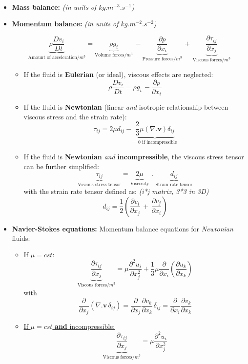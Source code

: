 \documentclass[a4paper,11pt]{article}
\begin{document}
\begin{itemize}
	\item \textbf{Mass balance:} \textit{(in units of $kg.m^{-3}.s^{-1}$)}
	\begin{center}
	\end{center}
	\item \textbf{Momentum balance:} \textit{(in units of $kg.m^{-2}.s^{-2}$)}
	\begin{center}
	\end{center}
	
	\[\underbrace{\rho \frac{Dv_i}{Dt}}_\textrm{Amount of acceleration/${m^3}$} = \underbrace{\rho g_i}_\textrm{Volume forces/${m^3}$}\, - \underbrace{\frac{\partial p}{\partial x_i}}_\textrm{Pressure forces/${m^3}$}\,+\, \underbrace{\frac{\partial \tau _ {ij}}{\partial x_j}}_\textrm{Viscous forces/${m^3}$}\]
		\begin{itemize}

		\item If the fluid is \textbf{Eulerian} (or ideal), viscous effects are neglected:
		\[\rho \frac{Dv_i}{Dt} = \rho g_i\, - \frac{\partial p}{\partial x_i}\]
		\item If the fluid is \textbf{Newtonian} (linear \emph{and} isotropic relationship between viscous stress and the strain rate): 
		\[\tau _{ij} = 2\mu d_{ij} - \underbrace{\frac{2}{3}\mu(\nabla.\mathbf{v})\delta_{ij}}_\textrm{= 0 if incompressible}\]
		\item If the fluid is \textbf{Newtonian} \emph{and} \textbf{incompressible}, the viscous stress tensor can be further simplified:           
		\[\underbrace{\tau _{ij}}_\textrm{Viscous stress tensor} = \underbrace{2\mu}_\textrm{Viscosity}\,\,.\,\,\underbrace{d_{ij}}_\textrm{Strain rate tensor}\]
		with the strain rate tensor defined as: \emph{(i*j matrix, 3*3 in 3D)}
		\[d_{ij}=\frac{1}{2} (\frac{\partial v_i}{\partial x_j}\,+\,\frac{\partial v_j}{\partial x_i})\]
	\end{itemize}
	\item \textbf{Navier-Stokes equations:} Momentum balance equations for \emph{Newtonian} fluids:
	\begin{itemize}     
	\item \underline{If  $\mu = cst$:}
	\[\underbrace{\frac{\partial \tau _ {ij}}{\partial x_j}}_\textrm{Viscous forces/${m^3}$} = \mu\frac{\partial^2 u_i}{\partial x_j^2}+\frac{1}{3}\mu\frac{\partial }{\partial x_i}(\frac{\partial u_k}{\partial x_k})\]
	with
	\[\frac{\partial }{\partial x_j}(\nabla.\mathbf{v}\,\delta _{ij})=\frac{\partial }{\partial x_j}\frac{\partial v_k}{\partial x_k}\,\delta _{ij}= \frac{\partial}{\partial x_i}\frac{\partial v_k}{\partial x_k}\]
	\item \underline{If  $\mu = cst$ \textbf{and} incompressible:}
	\[\underbrace{\frac{\partial \tau _ {ij}}{\partial x_j}}_\textrm{Viscous forces/${m^3}$} = \mu\frac{\partial^2 u_i}{\partial x_j^2}\]
\end{itemize}
\end{itemize}
\end{document}
